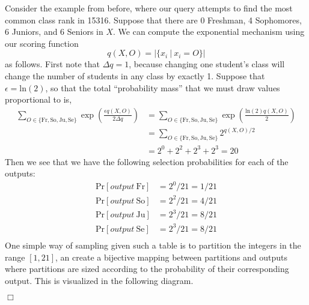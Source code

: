 \documentclass[11pt,twoside]{scrartcl}
\begin{document}
\begin{example}
    Consider the example from before, where our query attempts to find the most common class rank in 15316. Suppose that there are 0 Freshman, 4 Sophomores, 6 Juniors, and 6 Seniors in $X$. We can compute the exponential mechanism using our scoring function
    \begin{equation}
    q(X,O) = |\{x_i\ |\ x_i = O\}|
    \end{equation}
    as follows. First note that $\Delta q = 1$, because changing one student's class will change the number of students in any class by exactly 1. Suppose that $\epsilon = \mathrm{ln}(2)$, so that the total ``probability mass'' that we must draw values proportional to is,
    \begin{align}
    \sum_{O \in \{\mathrm{Fr},\mathrm{So},\mathrm{Ju},\mathrm{Se}\}} \exp\left(\frac{\epsilon q(X,O)}{2\Delta q}\right)
    &= 
    \sum_{O \in \{\mathrm{Fr},\mathrm{So},\mathrm{Ju},\mathrm{Se}\}} \exp\left(\frac{\mathrm{ln}(2) q(X,O)}{2}\right)
    \\
    &=
    \sum_{O \in \{\mathrm{Fr},\mathrm{So},\mathrm{Ju},\mathrm{Se}\}} 2^{q(X,O)/2}
    \\
    &=
    2^{0} + 2^{2} + 2^{3} + 2^{3} = 20
    \end{align}
    Then we see that we have the following selection probabilities for each of the outputs:
    \[
    \begin{array}{ll}
    \mathrm{Pr}[\mathit{output\ } \mathrm{Fr}] &= 2^0/21 = 1/21 \\
    \mathrm{Pr}[\mathit{output\ } \mathrm{So}] &= 2^2/21 = 4/21 \\
    \mathrm{Pr}[\mathit{output\ } \mathrm{Ju}] &= 2^3/21 = 8/21 \\
    \mathrm{Pr}[\mathit{output\ } \mathrm{Se}] &= 2^3/21 = 8/21 \\
    \end{array}
    \]
    One simple way of sampling given such a table is to partition the integers in the range $[1,21]$, an create a bijective mapping between partitions and outputs where partitions are sized according to the probability of their corresponding output. This is visualized in the following diagram.
    
    \begin{center}
    \end{center}
$\Box$
\end{example}
\end{document}
